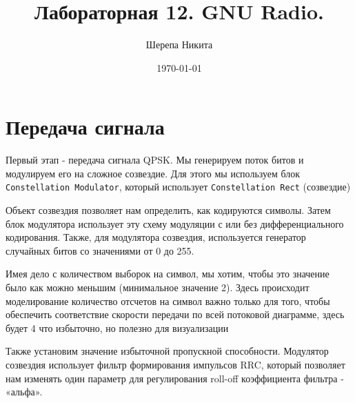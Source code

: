 \documentclass[a4paper,12pt]{article}
\author{Шерепа Никита}
\title{Лабораторная 12. GNU Radio.}
\date{\today}
\begin{document}
%
	
	\maketitle
	
	\newpage \tableofcontents
	\newpage \listoffigures
	
	\newpage
	
	

	\section{Передача сигнала}

	Первый этап - передача сигнала QPSK. Мы генерируем поток битов и модулируем его на сложное созвездие. Для этого мы используем блок \texttt{Constellation Modulator}, который использует \texttt{Constellation Rect} (созвездие)
	
	Объект созвездия позволяет нам определить, как кодируются символы. Затем блок модулятора использует эту схему модуляции с или без дифференциального кодирования. Также, для модулятора созвездия, используется генератор случайных битов со значениями от 0 до 255.
	
	Имея дело с количеством выборок на символ, мы хотим, чтобы это значение было как можно меньшим (минимальное значение 2). Здесь происходит моделирование количество отсчетов на символ важно только для того, чтобы обеспечить соответствие скорости передачи по всей потоковой диаграмме, здесь будет 4 что избыточно, но полезно для визуализации
	
	Также установим значение избыточной пропускной способности. Модулятор созвездия использует фильтр формирования импульсов RRC, который позволяет нам изменять один параметр для регулирования roll-off коэффициента фильтра - «альфа».
	
\end{document}
